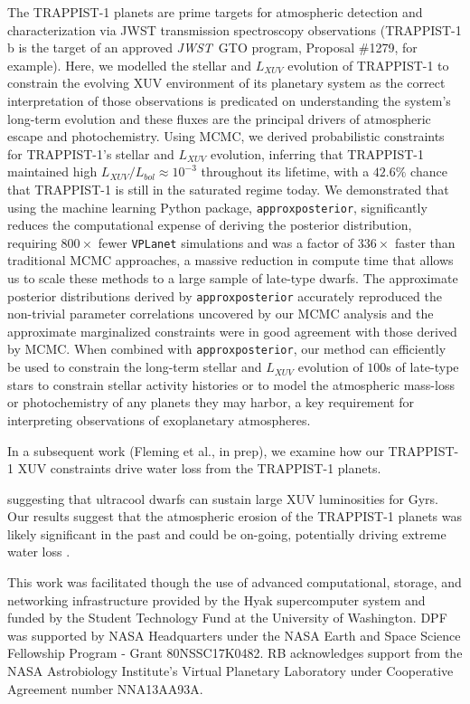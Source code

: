 \documentclass[twocolumn]{aastex62}
\newcommand{\vplanet}[0]{\texttt{VPLanet}\xspace}
\newcommand{\approxposterior}[0]{\texttt{approxposterior}\xspace}
\newcommand{\jwst}[0]{\textit{JWST}\xspace}
\begin{document}
The TRAPPIST-1 planets are prime targets for atmospheric detection and characterization via JWST transmission spectroscopy observations (TRAPPIST-1 b is the target of an approved \jwst~GTO program, Proposal \#1279, for example). Here, we modelled the stellar and $L_{XUV}$ evolution of TRAPPIST-1 to constrain the evolving XUV environment of its planetary system as the correct interpretation of those observations is predicated on understanding the system's long-term evolution and these fluxes are the principal drivers of atmospheric escape and photochemistry. Using MCMC, we derived probabilistic constraints for TRAPPIST-1's stellar and $L_{XUV}$ evolution, inferring that TRAPPIST-1 maintained high $L_{XUV}/L_{bol} \approx 10^{-3}$ throughout its lifetime, with a $42.6\%$ chance that TRAPPIST-1 is still in the saturated regime today.  We demonstrated that using the machine learning Python package, \approxposterior \citep{FlemingVanderPlas2018}, significantly reduces the computational expense of deriving the posterior distribution, requiring $800\times$ fewer \vplanet simulations and was a factor of $336\times$ faster than traditional MCMC approaches, a massive reduction in compute time that allows us to scale these methods to a large sample of late-type dwarfs. The approximate posterior distributions derived by \approxposterior accurately reproduced the non-trivial parameter correlations uncovered by our MCMC analysis and the approximate marginalized constraints were in good agreement with those derived by MCMC. When combined with \approxposterior, our method can efficiently be used to constrain the long-term stellar and $L_{XUV}$ evolution of $100$s of late-type stars to constrain stellar activity histories or to model the atmospheric mass-loss or photochemistry of any planets they may harbor, a key requirement for interpreting observations of exoplanetary atmospheres.

In a subsequent work (Fleming et al., in prep), we examine how our TRAPPIST-1 XUV constraints drive water loss from the TRAPPIST-1 planets.

suggesting that ultracool dwarfs can sustain large XUV luminosities for Gyrs. Our results suggest that the atmospheric erosion of the TRAPPIST-1 planets was likely significant in the past and could be on-going, potentially driving extreme water loss \citep{Bolmont2017,Bourrier2017a}.

\acknowledgments
This work was facilitated though the use of advanced computational, storage, and networking infrastructure provided by the Hyak supercomputer system and funded by the Student Technology Fund at the University of Washington. DPF was supported by NASA Headquarters under the NASA Earth and Space Science Fellowship Program - Grant 80NSSC17K0482.  RB acknowledges support from the NASA Astrobiology Institute's Virtual Planetary Laboratory under Cooperative Agreement number NNA13AA93A.
\end{document}
